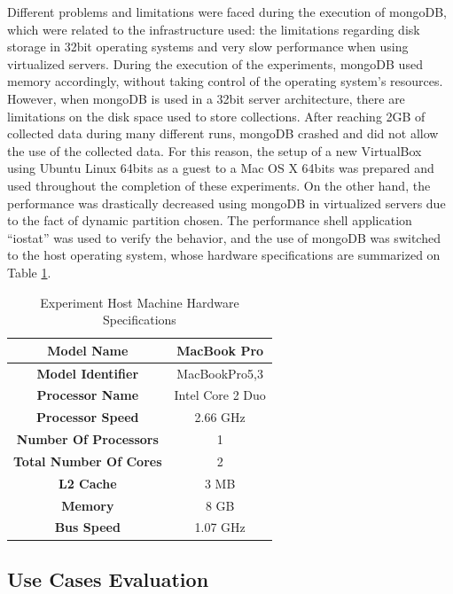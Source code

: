 Different problems and limitations were faced during the execution of
mongoDB, which were related to the infrastructure used: the limitations
regarding disk storage in 32bit operating systems and very slow
performance when using virtualized servers. During the execution of the
experiments, mongoDB used memory accordingly, without taking control of the
operating system's resources. However, when mongoDB is used in a 32bit server
architecture, there are limitations on the disk space used to store
collections. After reaching 2GB of collected data during many different runs,
mongoDB crashed and did not allow the use of the collected data. For this
reason, the setup of a new VirtualBox using Ubuntu Linux 64bits as a guest to
a Mac OS X 64bits was prepared and used throughout the completion of these
experiments. On the other hand, the performance was drastically decreased 
using mongoDB in virtualized servers due to the fact of dynamic partition
chosen. The performance shell application ``iostat'' was used to verify the
behavior, and the use of mongoDB was switched to the host operating system,
whose hardware specifications are summarized on Table \ref{tab:mac-os-setup}.

\begin{table}[!h] 
    \label{tab:mac-os-setup}
    \caption{Experiment Host Machine Hardware Specifications}
    \begin{center}
        \begin{tabular}{|c|c|}\hline 
        \textbf{Model Name} &  MacBook Pro\\\hline
        \textbf{Model Identifier} & MacBookPro5,3\\\hline 
        \textbf{Processor Name} & Intel Core 2 Duo\\\hline 
        \textbf{Processor Speed} & 2.66 GHz\\\hline 
        \textbf{Number Of Processors} & 1\\\hline 
        \textbf{Total Number Of Cores} & 2\\\hline 
        \textbf{L2 Cache} & 3 MB\\\hline 
        \textbf{Memory} & 8 GB\\\hline 
        \textbf{Bus Speed} & 1.07 GHz\\\hline
        \end{tabular}
    \end{center}
\end{table}

\subsection{Use Cases Evaluation}

